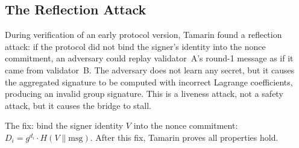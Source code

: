 \subsection{The Reflection Attack}

During verification of an early protocol version, Tamarin found a reflection attack: if
the protocol did not bind the signer's identity into the nonce commitment, an adversary
could replay validator~A's round-1 message as if it came from validator~B. The adversary
does not learn any secret, but it causes the aggregated signature to be computed with
incorrect Lagrange coefficients, producing an invalid group signature. This is a liveness
attack, not a safety attack, but it causes the bridge to stall.

The fix: bind the signer identity $V$ into the nonce commitment: $D_i = g^{d_i} \cdot H(V \| \text{msg})$.
After this fix, Tamarin proves all properties hold.

